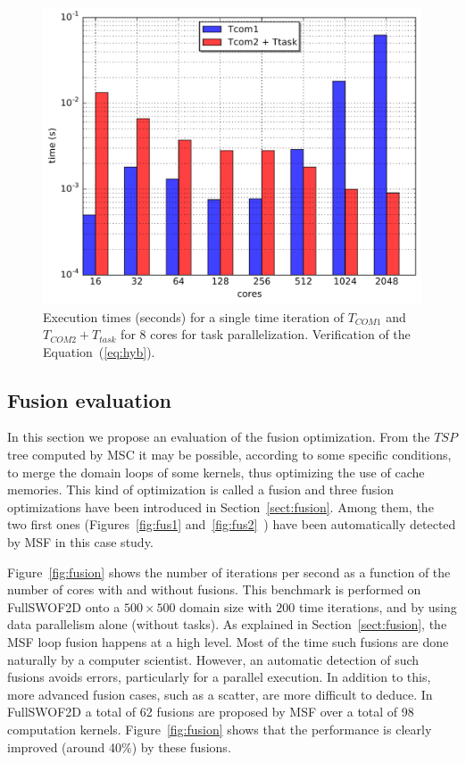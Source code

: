 \begin{figure}[!h]\begin{center}
  \includegraphics[width=.6\textwidth]{../results/task_scaling/500_200/analytic/tth2.pdf}
  \caption{Execution times (seconds) for a single time iteration of $T_{COM1}$ and $T_{COM2} + T_{task}$ for 8 cores for task parallelization. Verification of the Equation~(\ref{eq:hyb}).}
  \label{fig:tth2}
\end{center}\end{figure}

\subsection{Fusion evaluation}
\label{sect:fus}

In this section we propose an evaluation of the fusion optimization. From the $TSP$ tree computed by MSC it may be possible, according to some specific conditions, to merge the domain loops of some kernels, thus optimizing the use of cache memories. This kind of optimization is called a fusion and
three fusion optimizations have been introduced in Section~\ref{sect:fusion}. Among 
%
them, the two first ones (Figures~\ref{fig:fus1} and~\ref{fig:fus2}~) have been automatically detected by MSF in this case study.%

Figure~\ref{fig:fusion} shows the number of iterations per second as a function of the number of cores with and without fusions. This benchmark is performed on FullSWOF2D onto a $500 \times 500$ domain size with $200$ time iterations, and by using data parallelism alone (without tasks). As explained in Section~\ref{sect:fusion}, the MSF loop fusion happens at a high level. Most of the time such fusions are done naturally by a computer scientist. However, an automatic detection of such fusions avoids errors, particularly for a parallel execution. In addition to this, more advanced fusion cases, such as a scatter, are more difficult to deduce. In FullSWOF2D a total of  62 fusions are proposed by MSF over a total of 98 computation kernels. Figure~\ref{fig:fusion} shows that the performance is clearly improved (around 40\%) by these fusions.

